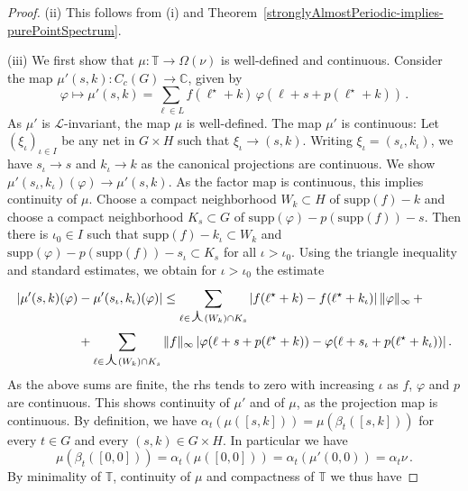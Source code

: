 \documentclass[11pt, a4wide]{amsart}
\newcommand{\TT}{\mathbb{T}}
\newcommand{\oplam}{\mbox{\Large $\curlywedge$}}
\newcommand{\supp}{\mbox{supp}}
\newcommand{\cL}{\mathcal L}
\numberwithin{lemma}{section}
\begin{document}
\begin{proof}
\smallskip

\noindent (ii) This follows from (i) and Theorem~\ref{stronglyAlmostPeriodic-implies-purePointSpectrum}.

\smallskip

\noindent (iii) We first show that $\mu:\TT\to \Omega(\nu)$ is well-defined and continuous.  Consider the map $\mu'(s,k):C_c(G)\to \mathbb C$, given by
%
\begin{displaymath}
\varphi \mapsto \mu'(s,k)=\sum_{\ell\in L} f(\ell^\star+k) \,\varphi (\ell+s + p(\ell^\star+k)) \,.
\end{displaymath}
%
As $\mu'$ is $\cL$-invariant, the map $\mu$ is well-defined.
The map $\mu'$ is continuous: Let $(\xi_\iota)_{\iota\in I}$ be any net in $G\times H$ such that $\xi_\iota\to (s,k)$. Writing $\xi_\iota=(s_\iota,k_\iota)$, we have $s_\iota\to s$ and $k_\iota\to k$ as the canonical projections are continuous.   We show $\mu'(s_\iota,k_\iota)(\varphi)\to \mu'(s,k)$. As the factor map is continuous, this implies continuity of $\mu$. Choose a compact neighborhood $W_k\subset H$ of $\supp(f)-k$ and choose a compact neighborhood $K_s\subset G$ of $\supp(\varphi)-p(\supp(f))-s$. Then there is $\iota_0 \in I$ such that $\supp(f)-k_\iota\subset W_k$ and $\supp(\varphi)-p(\supp(f))-s_\iota\subset K_s$ for all $\iota > \iota_0$. Using the triangle inequality and standard estimates, we obtain for $\iota > \iota_0$ the estimate
%
\begin{displaymath}
\begin{split}
|\mu'(s,k)(\varphi)&-\mu'(s_\iota,k_\iota)(\varphi)|\le
 \sum_{\ell \in \oplam(W_k)\cap K_s}  |f(\ell^{\star}+k) - f(\ell^{\star} +k_\iota)| \,\|\varphi\|_\infty \, +\\
&+ \sum_{\ell \in \oplam(W_k)\cap K_s}  \|f\|_\infty\, |\varphi(\ell+s+p(\ell^{\star}+k)) - \varphi(\ell+s_\iota+p(\ell^{\star}+k_\iota))| \,.
\end{split}
\end{displaymath}
%
%
As the above sums are finite, the rhs tends to zero with increasing $\iota$ as $f$, $\varphi$ and $p$ are continuous.  This shows continuity of $\mu'$ and of $\mu$, as the projection map is continuous.
By definition, we have $\alpha_t(\mu([s,k]))=\mu(\beta_t([s,k]))$
for every $t\in G$ and every $(s,k)\in G\times H$.
In particular we have
%
\begin{equation}\label{eq:mu0}
\mu(\beta_t([0,0]))=\alpha_t(\mu([0,0]))=\alpha_t(\mu'(0,0))=\alpha_t\nu\,.
\end{equation}
%
By minimality of  $\TT$, continuity of $\mu$ and compactness of  $\TT$ we thus have

\end{proof}
\end{document}
